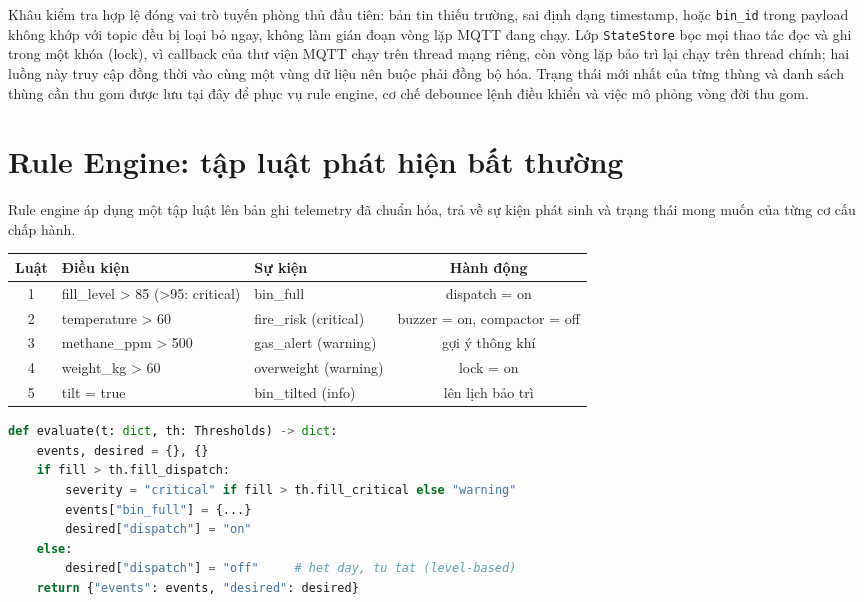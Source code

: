 \documentclass[12pt,a4paper]{article}
\begin{document}
Khâu kiểm tra hợp lệ đóng vai trò tuyến phòng thủ đầu tiên: bản tin thiếu trường, sai định dạng timestamp, hoặc \texttt{bin\_id} trong payload không khớp với topic đều bị loại bỏ ngay, không làm gián đoạn vòng lặp MQTT đang chạy. Lớp \texttt{StateStore} bọc mọi thao tác đọc và ghi trong một khóa (lock), vì callback của thư viện MQTT chạy trên thread mạng riêng, còn vòng lặp bảo trì lại chạy trên thread chính; hai luồng này truy cập đồng thời vào cùng một vùng dữ liệu nên buộc phải đồng bộ hóa. Trạng thái mới nhất của từng thùng và danh sách thùng cần thu gom được lưu tại đây để phục vụ rule engine, cơ chế debounce lệnh điều khiển và việc mô phỏng vòng đời thu gom.

\section{Rule Engine: tập luật phát hiện bất thường}

Rule engine áp dụng một tập luật lên bản ghi telemetry đã chuẩn hóa, trả về sự kiện phát sinh và trạng thái mong muốn của từng cơ cấu chấp hành.

\begin{center}
\begin{tabular}{cllc}
\toprule
\textbf{Luật} & \textbf{Điều kiện} & \textbf{Sự kiện} & \textbf{Hành động} \\
\midrule
1 & fill\_level > 85 (>95: critical) & bin\_full & dispatch = on \\
2 & temperature > 60 & fire\_risk (critical) & buzzer = on, compactor = off \\
3 & methane\_ppm > 500 & gas\_alert (warning) & gợi ý thông khí \\
4 & weight\_kg > 60 & overweight (warning) & lock = on \\
5 & tilt = true & bin\_tilted (info) & lên lịch bảo trì \\
\bottomrule
\end{tabular}
\end{center}

\begin{lstlisting}[language=Python]
def evaluate(t: dict, th: Thresholds) -> dict:
    events, desired = {}, {}
    if fill > th.fill_dispatch:
        severity = "critical" if fill > th.fill_critical else "warning"
        events["bin_full"] = {...}
        desired["dispatch"] = "on"
    else:
        desired["dispatch"] = "off"     # het day, tu tat (level-based)
    return {"events": events, "desired": desired}
\end{lstlisting}
\end{document}
